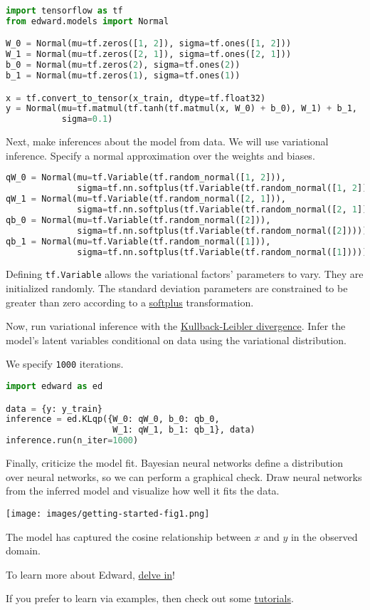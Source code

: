 \begin{lstlisting}[language=Python]
import tensorflow as tf
from edward.models import Normal

W_0 = Normal(mu=tf.zeros([1, 2]), sigma=tf.ones([1, 2]))
W_1 = Normal(mu=tf.zeros([2, 1]), sigma=tf.ones([2, 1]))
b_0 = Normal(mu=tf.zeros(2), sigma=tf.ones(2))
b_1 = Normal(mu=tf.zeros(1), sigma=tf.ones(1))

x = tf.convert_to_tensor(x_train, dtype=tf.float32)
y = Normal(mu=tf.matmul(tf.tanh(tf.matmul(x, W_0) + b_0), W_1) + b_1,
           sigma=0.1)
\end{lstlisting}

Next, make inferences about the model from data. We will use variational
inference. Specify a normal approximation over the weights and biases.

\begin{lstlisting}[language=Python]
qW_0 = Normal(mu=tf.Variable(tf.random_normal([1, 2])),
              sigma=tf.nn.softplus(tf.Variable(tf.random_normal([1, 2]))))
qW_1 = Normal(mu=tf.Variable(tf.random_normal([2, 1])),
              sigma=tf.nn.softplus(tf.Variable(tf.random_normal([2, 1]))))
qb_0 = Normal(mu=tf.Variable(tf.random_normal([2])),
              sigma=tf.nn.softplus(tf.Variable(tf.random_normal([2]))))
qb_1 = Normal(mu=tf.Variable(tf.random_normal([1])),
              sigma=tf.nn.softplus(tf.Variable(tf.random_normal([1]))))
\end{lstlisting}

Defining \texttt{tf.Variable} allows the variational factors'
parameters to vary. They are initialized randomly.  The standard
deviation parameters are constrained to be greater than zero according
to a
\href{https://en.wikipedia.org/wiki/Rectifier_(neural_networks)}{softplus}
transformation.

Now, run variational inference with the
\href{https://en.wikipedia.org/wiki/Kullback–Leibler_divergence}{Kullback-Leibler divergence}.
Infer the model's latent variables conditional on data using the
variational distribution.

We specify \texttt{1000} iterations.
\begin{lstlisting}[language=Python]
import edward as ed

data = {y: y_train}
inference = ed.KLqp({W_0: qW_0, b_0: qb_0,
                     W_1: qW_1, b_1: qb_1}, data)
inference.run(n_iter=1000)
\end{lstlisting}

Finally, criticize the model fit. Bayesian neural networks define a distribution
over neural networks, so we can perform a graphical check. Draw neural networks
from the inferred model and visualize how well it fits the data.

\texttt{[image: images/getting-started-fig1.png]}

The model has captured the cosine relationship between $x$ and $y$
in the observed domain.

To learn more about Edward, \href{/api}{delve in}!

If you prefer to learn via examples, then check out some
\href{/tutorials/}{tutorials}.
